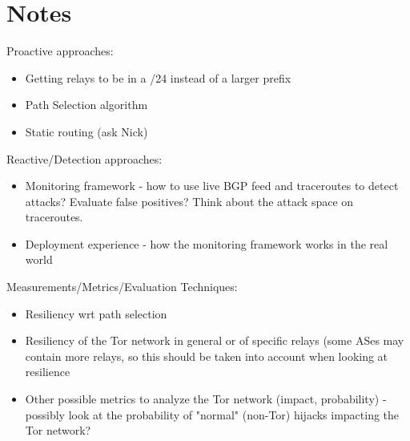\section{Notes}
Proactive approaches:
\begin{itemize}
\item Getting relays to be in a /24 instead of a larger prefix
\item Path Selection algorithm
\item Static routing (ask Nick)
\end{itemize}

Reactive/Detection approaches:
\begin{itemize}
\item Monitoring framework - how to use live BGP feed and traceroutes to detect attacks?  Evaluate false positives?  Think about the attack space on traceroutes.
\item Deployment experience - how the monitoring framework works in the real world
\end{itemize}

Measurements/Metrics/Evaluation Techniques:
\begin{itemize}
\item Resiliency wrt path selection
\item Resiliency of the Tor network in general or of specific relays (some ASes may contain more relays, so this should be taken into account when looking at resilience
\item Other possible metrics to analyze the Tor network (impact, probability) - possibly look at the probability of "normal" (non-Tor) hijacks impacting the Tor network?
\end{itemize}

